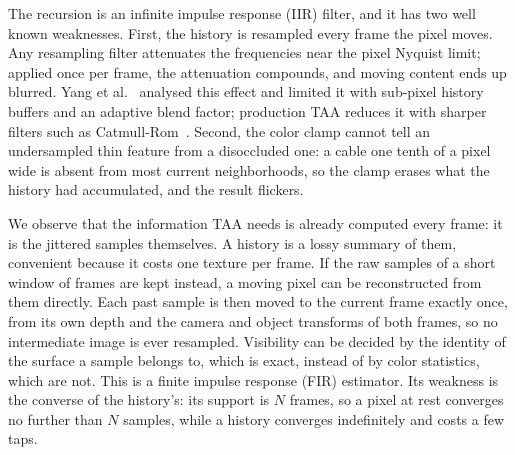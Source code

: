 \documentclass[11pt,a4paper]{article}
\begin{document}
The recursion is an infinite impulse response (IIR) filter, and it has two well known weaknesses. First, the history is resampled every frame the pixel moves. Any resampling filter attenuates the frequencies near the pixel Nyquist limit; applied once per frame, the attenuation compounds, and moving content ends up blurred. Yang et al.~\cite{yang2009amortized} analysed this effect and limited it with sub-pixel history buffers and an adaptive blend factor; production TAA reduces it with sharper filters such as Catmull-Rom~\cite{catmull1974splines,jimenez2016filmic}. Second, the color clamp cannot tell an undersampled thin feature from a disoccluded one: a cable one tenth of a pixel wide is absent from most current neighborhoods, so the clamp erases what the history had accumulated, and the result flickers.

We observe that the information TAA needs is already computed every frame: it is the jittered samples themselves. A history is a lossy summary of them, convenient because it costs one texture per frame. If the raw samples of a short window of frames are kept instead, a moving pixel can be reconstructed from them directly. Each past sample is then moved to the current frame exactly once, from its own depth and the camera and object transforms of both frames, so no intermediate image is ever resampled. Visibility can be decided by the identity of the surface a sample belongs to, which is exact, instead of by color statistics, which are not. This is a finite impulse response (FIR) estimator. Its weakness is the converse of the history's: its support is $N$ frames, so a pixel at rest converges no further than $N$ samples, while a history converges indefinitely and costs a few taps.
\end{document}
